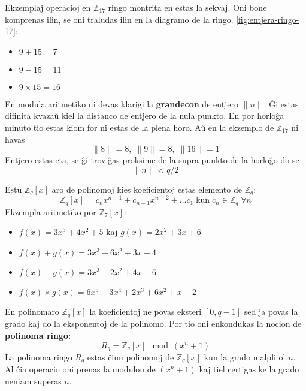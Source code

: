 \documentclass[utf8]{scrartcl}
\makeatletter
\renewenvironment{figure}[1][]{%
  \ifthenelse{\equal{#1}{}}{%
    \@float{figure}%
  }{%
    \@float{figure}[#1]%
  }%
  \centering%
}{%
\end@float\ignorespaces\ignorespacesafterend%
}
\makeatother
\begin{document}
\begin{figure}
  \caption{Ekzemplo por $\mathbb{Z}_{17}$ entjera ringo}
  \label{fig:entjera-ringo-17}
\end{figure}
%
Ekzemplaj operacioj en $\mathbb{Z}_{17}$ ringo montrita en estas la sekvaj. Oni
bone komprenas ilin, se oni traludas ilin en la diagramo de la ringo.
\ref{fig:entjera-ringo-17}:
\begin{itemize}
\item $9 + 15 = 7$
\item $9 - 15 = 11$
\item $9 \times 15 = 16$
\end{itemize}
%
En modula aritmetiko ni devas klarigi la \textbf{grandecon} de entjero
$\big\|n\big\|$. Ĝi estas difinita kvazaŭ kiel la distanco de entjero de la
nula punkto. En por horloĝa minuto tio estas kiom for ni estas de la plena
horo. Aŭ en la ekzemplo de $\mathbb{Z}_{17}$ ni havas
\[
  \big\|8\big\| = 8,\; \big\|9\big\| = 8,\; \big\|16\big\| = 1
\]
Entjero estas eta, se ĝi troviĝas proksime de la supra punkto de la horloĝo do se
\[
 \big\|n\big\| < q/2
\]


Estu $\mathbb{Z}_q[x]$ aro de polinomoj kies koeficientoj estas elemento de $\mathbb{Z}_q$:
\begin{equation}
  \label{eq:polinomaro}
  \mathbb{Z}_q[x] = c_n x^{n-1} + c_{n-1} x^{n-2} + \ldots c_1
  \;\text{kun}\; c_n \in \mathbb{Z}_q \;\forall n
\end{equation}
%
Ekzempla aritmetiko por $\mathbb{Z}_7[x]$:
\begin{itemize}
\item $f(x) = 3x^3 + 4x^2 + 5$ kaj $g(x) = 2x^2 + 3x + 6$
\item $f(x) + g(x) = 3x^3 + 6x^2 + 3x + 4$
\item $f(x) - g(x) = 3x^3 + 2x^2 + 4x + 6$
\item $f(x) \times g(x) = 6x^5 + 3x^4 + 2x^3 + 6x^2 + x + 2$
\end{itemize}

En polinomaro $\mathbb{Z}_q[x]$ la koeficientoj ne povas eksteri $[0, q-1]$ sed
ja povas la grado kaj do la eksponentoj de la polinomo.  Por tio oni enkondukas
la nocion de \textbf{polinoma ringo}:
\begin{equation}
  \label{eq:polinoma-ringo}
  R_q = \mathbb{Z}_q[x] \mod \left(x^n+1\right)
\end{equation}
%
La polinoma ringo $R_q$ estas ĉiun polinomoj de $\mathbb{Z}_q[x]$ kun la grado
malpli ol $n$. Al ĉia operacio oni prenas la modulon de $\left(x^n+1\right)$
kaj tiel certigas ke la grado neniam superas $n$.
\end{document}
